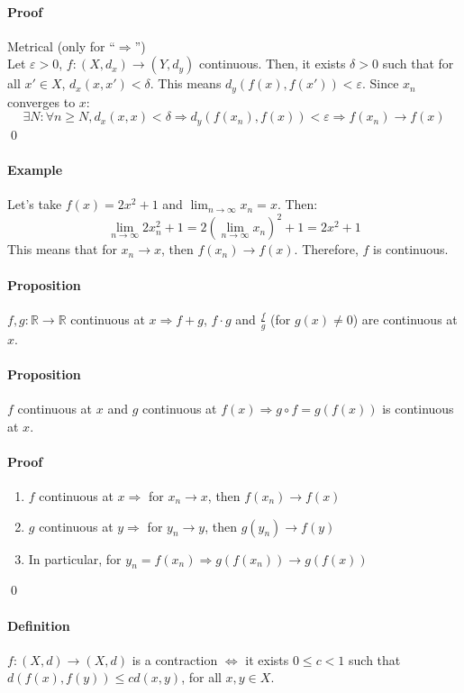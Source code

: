 \documentclass{article}
\newcommand{\func}[3]{#1 : #2 \rightarrow #3}
\newcommand{\funcR}[1]{#1 : \mathbb{R} \rightarrow \mathbb{R}}
\newcommand{\limn}{\lim_{n \to \infty}}
\newcommand{\DS}{\displaystyle}
\newcommand{\Ep}{\varepsilon}
\newcommand{\Def}{\paragraph{Definition}}
\newcommand{\Proposition}{\paragraph{Proposition}}
\newcommand{\Proof}{\paragraph{Proof}}
\newcommand{\Example}{\paragraph{Example}}
\begin{document}
	\Proof Metrical (only for ``$\Rightarrow$'')
\\Let $\Ep > 0$, $\func{f}{(X,d_x)}{(Y,d_y)}$ continuous. Then, it exists
	$\delta > 0$ such that for all $x' \in X$, $d_x(x,x') < \delta$. This means
	$d_y(f(x),f(x')) < \Ep$. Since $x_n$ converges to $x$:
	\begin{equation*}
		\exists N : \forall n \geq N, d_x(x,x) < \delta \Rightarrow d_y(f(x_n),f(x))
		< \Ep \Rightarrow f(x_n) \to f(x)
	\end{equation*}
	\qed

	\Example Let's take $f(x) = 2x^2 + 1$ and $\DS \limn x_n = x$. Then:
	\begin{equation*}
		\limn 2x_n^2 + 1 = 2 \left(\limn x_n\right)^2 + 1 = 2x^2 + 1
	\end{equation*}
	This means that for $x_n \to x$, then $f(x_n) \to f(x)$. Therefore, $f$ is
	continuous.

	\Proposition $\funcR{f,g}$ continuous at $x \Rightarrow f+g$, $f \cdot g$ and
	$\frac{f}{g}$ (for $g(x) \neq 0$) are continuous at $x$.

	\Proposition $f$ continuous at $x$ and $g$ continuous at $f(x) \Rightarrow
	g \circ f = g(f(x))$ is continuous at $x$.

	\Proof
	\begin{enumerate}[label=(\arabic*)]
		\item $f$ continuous at $x \Rightarrow$ for $x_n \to x$, then $f(x_n) \to f(x)$
		\item $g$ continuous at $y \Rightarrow$ for $y_n \to y$, then $g(y_n) \to f(y)$
		\item In particular, for $y_n = f(x_n) \Rightarrow g(f(x_n)) \to g(f(x))$
	\end{enumerate}
	\qed

	\Def $\func{f}{(X,d)}{(X,d)}$ is a contraction $\iff$ it exists $0 \leq c < 1$
	such that $d(f(x),f(y)) \leq cd(x,y)$, for all $x,y \in X$.
\end{document}
